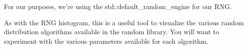 For our purposes, we're using the std::default\_random\_engine for our RNG.

As with the RNG histogram, this is a useful tool to visualize the various random distribution algorithms available in the random library. You will want to experiment with the various parameters available for each algorithm.











